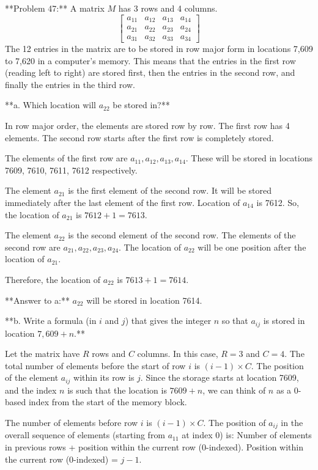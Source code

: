 \documentclass{article}
\begin{document}
**Problem 47:** A matrix $M$ has 3 rows and 4 columns.
$$
\begin{bmatrix}
a_{11} & a_{12} & a_{13} & a_{14} \\
a_{21} & a_{22} & a_{23} & a_{24} \\
a_{31} & a_{32} & a_{33} & a_{34}
\end{bmatrix}
$$
The 12 entries in the matrix are to be stored in row major form in locations 7,609 to 7,620 in a computer's memory. This means that the entries in the first row (reading left to right) are stored first, then the entries in the second row, and finally the entries in the third row.

**a. Which location will $a_{22}$ be stored in?**

In row major order, the elements are stored row by row. The first row has 4 elements. The second row starts after the first row is completely stored.

The elements of the first row are $a_{11}, a_{12}, a_{13}, a_{14}$.
These will be stored in locations 7609, 7610, 7611, 7612 respectively.

The element $a_{21}$ is the first element of the second row. It will be stored immediately after the last element of the first row.
Location of $a_{14}$ is 7612.
So, the location of $a_{21}$ is $7612 + 1 = 7613$.

The element $a_{22}$ is the second element of the second row.
The elements of the second row are $a_{21}, a_{22}, a_{23}, a_{24}$.
The location of $a_{22}$ will be one position after the location of $a_{21}$.

Therefore, the location of $a_{22}$ is $7613 + 1 = 7614$.

**Answer to a:** $a_{22}$ will be stored in location 7614.

**b. Write a formula (in $i$ and $j$) that gives the integer $n$ so that $a_{ij}$ is stored in location $7,609 + n$.**

Let the matrix have $R$ rows and $C$ columns. In this case, $R=3$ and $C=4$.
The total number of elements before the start of row $i$ is $(i-1) \times C$.
The position of the element $a_{ij}$ within its row is $j$.
Since the storage starts at location 7609, and the index $n$ is such that the location is $7609 + n$, we can think of $n$ as a 0-based index from the start of the memory block.

The number of elements before row $i$ is $(i-1) \times C$.
The position of $a_{ij}$ in the overall sequence of elements (starting from $a_{11}$ at index 0) is:
Number of elements in previous rows + position within the current row (0-indexed).
Position within the current row (0-indexed) = $j-1$.
\end{document}
